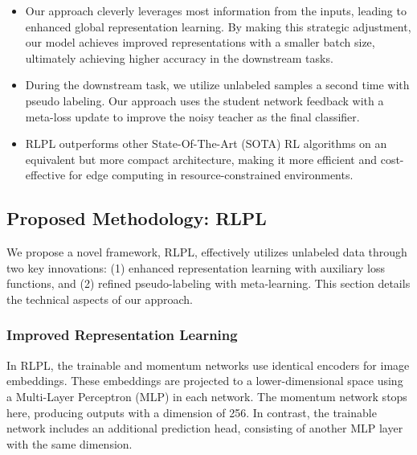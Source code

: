 \begin{itemize}

    \item Our approach cleverly leverages most information from the inputs, leading to enhanced global representation learning. By making this strategic adjustment, our model achieves improved representations with a smaller batch size, ultimately achieving higher accuracy in the downstream tasks.
    
    \item During the downstream task, we utilize unlabeled samples a second time with pseudo labeling. Our approach uses the student network feedback with a meta-loss update to improve the noisy teacher \cite{xie2020self} as the final classifier.
    
    \item RLPL outperforms other State-Of-The-Art (SOTA) RL algorithms on an equivalent but more compact architecture, making it more efficient and cost-effective for edge computing in resource-constrained environments.
    
    \end{itemize}

\subsection{Proposed Methodology: RLPL}

We propose a novel framework, RLPL, effectively utilizes unlabeled data through two key innovations: (1) enhanced representation learning with auxiliary loss functions, and (2) refined pseudo-labeling with meta-learning. This section details the technical aspects of our approach.


\subsubsection{Improved Representation Learning}

In RLPL, the trainable and momentum networks use identical encoders for image embeddings. These embeddings are projected to a lower-dimensional space using a Multi-Layer Perceptron (MLP) in each network. The momentum network stops here, producing outputs with a dimension of 256. In contrast, the trainable network includes an additional prediction head, consisting of another MLP layer with the same dimension.

